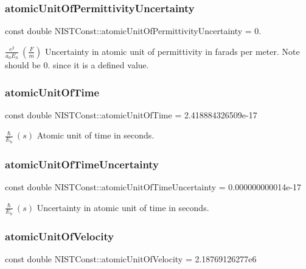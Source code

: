 \subsubsection{\texorpdfstring{atomic\+Unit\+Of\+Permittivity\+Uncertainty}{atomicUnitOfPermittivityUncertainty}}
{\footnotesize\ttfamily const double N\+I\+S\+T\+Const\+::atomic\+Unit\+Of\+Permittivity\+Uncertainty = 0.}

$\frac{e^2}{a_0 E_h} \ (\frac{F}{m})$ Uncertainty in atomic unit of permittivity in farads per meter. Note should be 0. since it is a defined value. \mbox{\label{group___atomic_unit_ga6181f64b8320afb6ecacc9c7f7e27afa}} 
\subsubsection{\texorpdfstring{atomic\+Unit\+Of\+Time}{atomicUnitOfTime}}
{\footnotesize\ttfamily const double N\+I\+S\+T\+Const\+::atomic\+Unit\+Of\+Time = 2.\+418884326509e-\/17}

$\frac{\hbar}{E_h} \ (s)$ Atomic unit of time in seconds. \mbox{\label{group___atomic_unit_ga18e7346fb75798ae9f339c99b3852950}} 
\subsubsection{\texorpdfstring{atomic\+Unit\+Of\+Time\+Uncertainty}{atomicUnitOfTimeUncertainty}}
{\footnotesize\ttfamily const double N\+I\+S\+T\+Const\+::atomic\+Unit\+Of\+Time\+Uncertainty = 0.\+000000000014e-\/17}

$\frac{\hbar}{E_h} \ (s)$ Uncertainty in atomic unit of time in seconds. \mbox{\label{group___atomic_unit_gaf22e630a5412176c4d94dbc8b1e36f70}} 
\subsubsection{\texorpdfstring{atomic\+Unit\+Of\+Velocity}{atomicUnitOfVelocity}}
{\footnotesize\ttfamily const double N\+I\+S\+T\+Const\+::atomic\+Unit\+Of\+Velocity = 2.\+18769126277e6}

